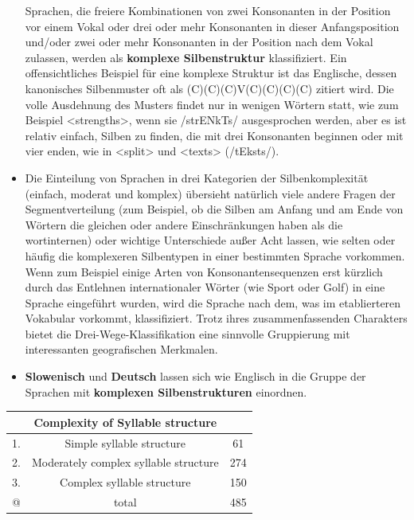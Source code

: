 \documentclass[
  letterpaper,
]{scrbook}
\begin{document}
\begin{itemize}
  Sprachen, die freiere Kombinationen von zwei Konsonanten in der
  Position vor einem Vokal oder drei oder mehr Konsonanten in dieser
  Anfangsposition und/oder zwei oder mehr Konsonanten in der Position
  nach dem Vokal zulassen, werden als \textbf{komplexe Silbenstruktur}
  klassifiziert. Ein offensichtliches Beispiel für eine komplexe
  Struktur ist das Englische, dessen kanonisches Silbenmuster oft als
  (C)(C)(C)V(C)(C)(C)(C) zitiert wird. Die volle Ausdehnung des Musters
  findet nur in wenigen Wörtern statt, wie zum Beispiel
  \textless strengths\textgreater, wenn sie /strENkTs/ ausgesprochen
  werden, aber es ist relativ einfach, Silben zu finden, die mit drei
  Konsonanten beginnen oder mit vier enden, wie in
  \textless split\textgreater{} und \textless texts\textgreater{}
  (/tEksts/).
\item
  Die Einteilung von Sprachen in drei Kategorien der Silbenkomplexität
  (einfach, moderat und komplex) übersieht natürlich viele andere Fragen
  der Segmentverteilung (zum Beispiel, ob die Silben am Anfang und am
  Ende von Wörtern die gleichen oder andere Einschränkungen haben als
  die wortinternen) oder wichtige Unterschiede außer Acht lassen, wie
  selten oder häufig die komplexeren Silbentypen in einer bestimmten
  Sprache vorkommen. Wenn zum Beispiel einige Arten von
  Konsonantensequenzen erst kürzlich durch das Entlehnen internationaler
  Wörter (wie Sport oder Golf) in eine Sprache eingeführt wurden, wird
  die Sprache nach dem, was im etablierteren Vokabular vorkommt,
  klassifiziert. Trotz ihres zusammenfassenden Charakters bietet die
  Drei-Wege-Klassifikation eine sinnvolle Gruppierung mit interessanten
  geografischen Merkmalen.
\item
  \textbf{Slowenisch} und \textbf{Deutsch} lassen sich wie Englisch in
  die Gruppe der Sprachen mit \textbf{komplexen Silbenstrukturen}
  einordnen.
\end{itemize}

\begin{longtable}[]{@{}ccc@{}}
\toprule()
~ & \textbf{Complexity of Syllable structure} & ~ \\
\midrule()
\endhead
1. & Simple syllable structure & 61 \\
2. & Moderately complex syllable structure & 274 \\
3. & Complex syllable structure & 150 \\
@ & total & 485 \\
\bottomrule()
\end{longtable}
\end{document}
